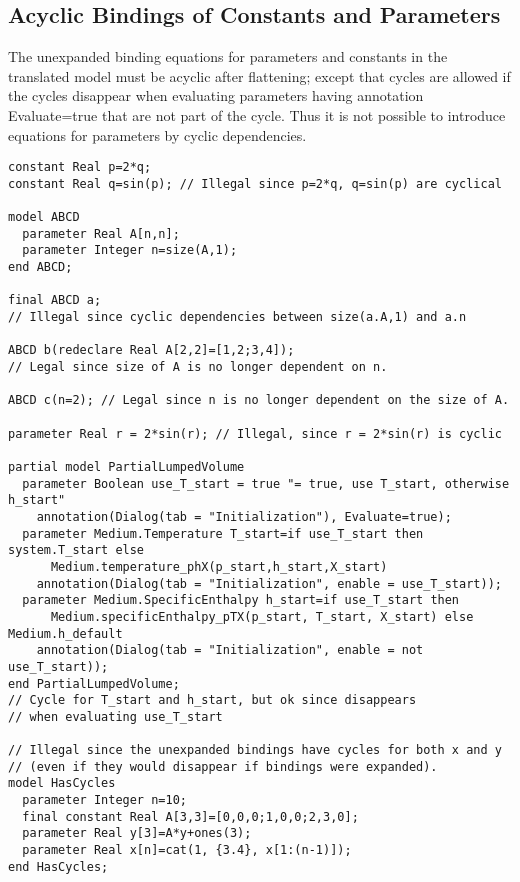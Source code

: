 \subsection{Acyclic Bindings of Constants and Parameters}

The unexpanded binding equations for parameters and constants in the
translated model must be acyclic after flattening; except that cycles
are allowed if the cycles disappear when evaluating parameters having
annotation Evaluate=true that are not part of the cycle. Thus it is not
possible to introduce equations for parameters by cyclic dependencies.

\begin{example}
\begin{lstlisting}[language=modelica]
constant Real p=2*q;
constant Real q=sin(p); // Illegal since p=2*q, q=sin(p) are cyclical

model ABCD
  parameter Real A[n,n];
  parameter Integer n=size(A,1);
end ABCD;

final ABCD a;
// Illegal since cyclic dependencies between size(a.A,1) and a.n

ABCD b(redeclare Real A[2,2]=[1,2;3,4]);
// Legal since size of A is no longer dependent on n.

ABCD c(n=2); // Legal since n is no longer dependent on the size of A.

parameter Real r = 2*sin(r); // Illegal, since r = 2*sin(r) is cyclic

partial model PartialLumpedVolume
  parameter Boolean use_T_start = true "= true, use T_start, otherwise h_start"
    annotation(Dialog(tab = "Initialization"), Evaluate=true);
  parameter Medium.Temperature T_start=if use_T_start then system.T_start else
      Medium.temperature_phX(p_start,h_start,X_start)
    annotation(Dialog(tab = "Initialization", enable = use_T_start));
  parameter Medium.SpecificEnthalpy h_start=if use_T_start then
      Medium.specificEnthalpy_pTX(p_start, T_start, X_start) else Medium.h_default
    annotation(Dialog(tab = "Initialization", enable = not use_T_start));
end PartialLumpedVolume;
// Cycle for T_start and h_start, but ok since disappears
// when evaluating use_T_start

// Illegal since the unexpanded bindings have cycles for both x and y
// (even if they would disappear if bindings were expanded).
model HasCycles
  parameter Integer n=10;
  final constant Real A[3,3]=[0,0,0;1,0,0;2,3,0];
  parameter Real y[3]=A*y+ones(3);
  parameter Real x[n]=cat(1, {3.4}, x[1:(n-1)]);
end HasCycles;
\end{lstlisting}
\end{example}

